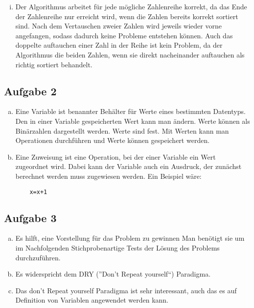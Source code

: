 \documentclass[11pt]{article}
\begin{document}
\begin{enumerate}[i)]
  \item Der Algorithmus arbeitet f\"ur jede m\"ogliche Zahlenreihe korrekt, da
    das Ende der Zahlenreihe nur erreicht wird, wenn die Zahlen bereits korrekt
    sortiert sind. Nach dem Vertauschen zweier Zahlen wird jeweils wieder vorne
    angefangen, sodass dadurch keine Probleme entstehen k\"onnen. Auch das
    doppelte auftauchen einer Zahl in der Reihe ist kein Problem, da der
    Algorithmus die beiden Zahlen, wenn sie direkt nacheinander auftauchen als
    richtig sortiert behandelt.
\end{enumerate}

\subsection*{Aufgabe 2}
\begin{enumerate}[a)]

  \item Eine Variable ist benannter Beh\"alter f\"ur Werte eines bestimmten
    Datentyps. Den in einer Variable gespeicherten Wert kann man \"andern.
    Werte k\"onnen als Bin\"arzahlen dargestellt werden. Werte sind fest. Mit
    Werten kann man Operationen durchf\"uhren und Werte k\"onnen gespeichert
    werden.

  \item Eine Zuweisung ist eine Operation, bei der einer Variable ein Wert
    zugeordnet wird. Dabei kann der Variable auch ein Ausdruck, der zun\"achst
    berechnet werden muss zugewiesen werden. Ein Beispiel w\"are:

    \begin{lstlisting}
    x=x+1
    \end{lstlisting}

\end{enumerate}
\subsection*{Aufgabe 3}
\begin{enumerate}[a)]
  \item Es hilft, eine Vorstellung f\"ur das Problem zu gewinnen Man ben\"otigt
    sie um im Nachfolgenden Stichprobenartige Tests der L\"osung des Problems
    durchzuf\"uhren.

  \item Es widerspricht dem DRY (''Don't Repeat yourself``) Paradigma.

  \item Das don't Repeat yourself Paradigma ist sehr interessant, auch das es
auf Definition von Variablen angewendet werden kann.  

\end{enumerate}
\end{document}
